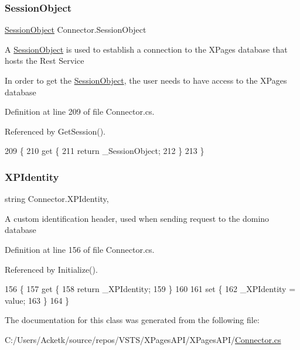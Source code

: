 \subsubsection{\texorpdfstring{Session\+Object}{SessionObject}}
{\footnotesize\ttfamily \mbox{\hyperlink{class_session_object}{Session\+Object}} Connector.\+Session\+Object\hspace{0.3cm}{\ttfamily [get]}}



A \mbox{\hyperlink{class_session_object}{Session\+Object}} is used to establish a connection to the X\+Pages database that hosts the Rest Service 

In order to get the \mbox{\hyperlink{class_session_object}{Session\+Object}}, the user needs to have access to the X\+Pages database

Definition at line 209 of file Connector.\+cs.



Referenced by Get\+Session().


\begin{DoxyCode}
209                                        \{
210         \textcolor{keyword}{get} \{
211             \textcolor{keywordflow}{return} \_SessionObject;
212         \}
213     \}
\end{DoxyCode}
\mbox{\label{class_connector_a092e3e36f92c129c07c57df9b8fb91ca}} 
\subsubsection{\texorpdfstring{X\+P\+Identity}{XPIdentity}}
{\footnotesize\ttfamily string Connector.\+X\+P\+Identity\hspace{0.3cm}{\ttfamily [get]}, {\ttfamily [set]}}



A custom identification header, used when sending request to the domino database 



Definition at line 156 of file Connector.\+cs.



Referenced by Initialize().


\begin{DoxyCode}
156                              \{
157         \textcolor{keyword}{get} \{
158             \textcolor{keywordflow}{return} \_XPIdentity;
159         \}
160 
161         \textcolor{keyword}{set} \{
162             \_XPIdentity = value;
163         \}
164     \}
\end{DoxyCode}


The documentation for this class was generated from the following file\+:\begin{DoxyCompactItemize}
\item 
C\+:/\+Users/\+Acketk/source/repos/\+V\+S\+T\+S/\+X\+Pages\+A\+P\+I/\+X\+Pages\+A\+P\+I/\mbox{\hyperlink{_connector_8cs}{Connector.\+cs}}\end{DoxyCompactItemize}
